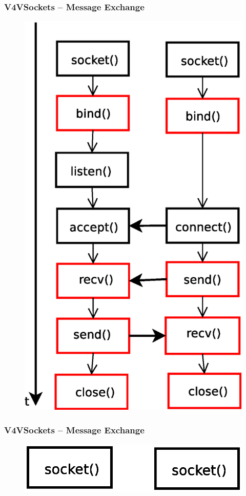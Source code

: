 \documentclass[red,slidestop,notes,compress,mathserif]{beamer}
\begin{document}
\begin{frame}
\frametitle{V4VSockets -- Message Exchange}
\begin{figure}
\includegraphics[scale=0.30]{figures/sockets.eps}
\end{figure}
\end{frame}

\begin{frame}
\frametitle{V4VSockets -- Message Exchange}
\begin{figure}
\includegraphics[scale=0.30]{figures/sockets6.eps}
\end{figure}
\end{frame}
\end{document}
